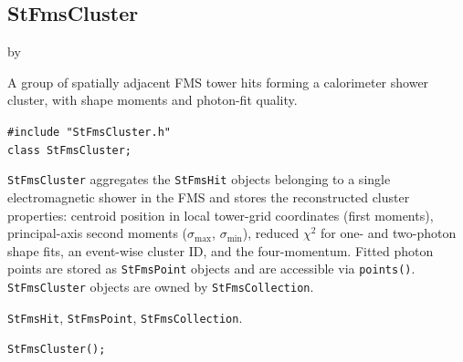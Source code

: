 \documentclass[twoside]{article}
\newcommand{\entrylabel}[1]{\mbox{\textbf{{#1}}}\hfil}%
\newenvironment{entry}
{\begin{list}{}%
    {\renewcommand{\makelabel}{\entrylabel}%
     \setlength{\labelwidth}{90pt}%
     \setlength{\leftmargin}{\labelwidth}
     \advance\leftmargin by \labelsep%
      }%
    }%
  {\end{list}}
\newcommand{\Entrylabel}[1]%
{\raisebox{0pt}[1ex][0pt]{\makebox[\labelwidth][l]%
    {\parbox[t]{\labelwidth}{\hspace{0pt}\textbf{{#1}}}}}}
\newenvironment{Entry}%
{\renewcommand{\entrylabel}{\Entrylabel}\begin{entry}}%
  {\end{entry}}
\begin{document}
\subsection{StFmsCluster}
\label{sec:StFmsCluster}
\begin{Entry}
\item[Summary]
    A group of spatially adjacent FMS tower hits forming a calorimeter
    shower cluster, with shape moments and photon-fit quality.

\item[Synopsis]
    \verb+#include "StFmsCluster.h"+\\
    \verb+class StFmsCluster;+\\

\item[Description]
    \texttt{StFmsCluster} aggregates the \texttt{StFmsHit} objects belonging
    to a single electromagnetic shower in the FMS and stores the reconstructed
    cluster properties: centroid position in local tower-grid coordinates
    (first moments), principal-axis second moments ($\sigma_{\max}$,
    $\sigma_{\min}$), reduced $\chi^{2}$ for one- and two-photon shape fits,
    an event-wise cluster ID, and the four-momentum.  Fitted photon points are
    stored as \texttt{StFmsPoint} objects and are accessible via
    \texttt{points()}.  \texttt{StFmsCluster} objects are owned by
    \texttt{StFmsCollection}.

\item[Related Classes]
    \texttt{StFmsHit}, \texttt{StFmsPoint}, \texttt{StFmsCollection}.

\item[Public\\ Constructors]
    \verb+StFmsCluster();+\\


\end{Entry}
\end{document}
